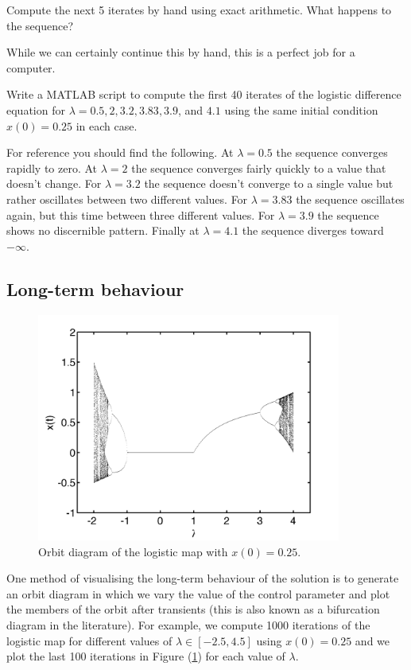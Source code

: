 \begin{del}
Compute the next 5 iterates by hand using exact arithmetic. What happens to the sequence?
\end{del}

While we can certainly continue this by hand, this is a perfect job for a computer.

\begin{del}
Write a MATLAB script to compute the first 40 iterates of the logistic difference equation for $\lambda = 0.5, 2, 3.2, 3.83, 3.9$, and $4.1$ using the same initial condition $x(0) = 0.25$ in each case.
\end{del}

For reference you should find the following. At $\lambda = 0.5$ the sequence converges rapidly to zero. At $\lambda=2$ the sequence converges fairly quickly to a value that doesn't change. For $\lambda=3.2$ the sequence doesn't converge to a single value but rather oscillates between two different values. For $\lambda=3.83$ the sequence oscillates again, but this time between three different values. For $\lambda=3.9$ the sequence shows no discernible pattern. Finally at $\lambda = 4.1$ the sequence diverges toward $- \infty$.

\subsection*{Long-term behaviour}

\begin{figure}[h]
\centering
\includegraphics[width=10cm]{figs/logistic_orbit}
\caption{Orbit diagram of the logistic map with $x(0) = 0.25$.}
\label{figure.logistic_orbit}
\end{figure}

One method of visualising the long-term behaviour of the solution is to generate an orbit diagram in which we vary the value of the control parameter and plot the members of the orbit after transients (this is also known as a bifurcation diagram in the literature).  For example, we compute 1000 iterations of the logistic map for different values of $\lambda \in [-2.5,4.5]$ using $x(0) = 0.25$ and we plot the last 100 iterations in Figure (\ref{figure.logistic_orbit}) for each value of $\lambda$. 

